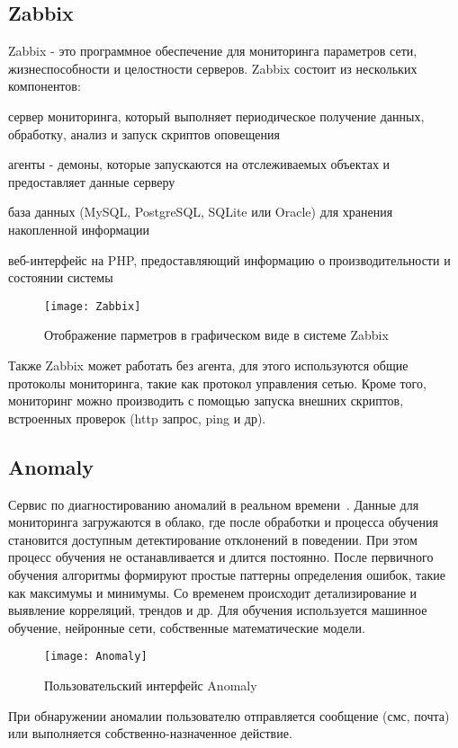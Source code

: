 \subsection{Zabbix}
Zabbix - это программное обеспечение для мониторинга параметров сети, жизнеспособности и целостности серверов. Zabbix состоит из нескольких компонентов:
\begin{itemize*}
	\item{сервер мониторинга, который выполняет периодическое получение данных, обработку, анализ и запуск скриптов оповещения}
	\item{агенты - демоны, которые запускаются на отслеживаемых объектах и предоставляет данные серверу}
	\item{база данных (MySQL, PostgreSQL, SQLite или Oracle) для хранения накопленной информации}
	\item{веб-интерфейс на PHP, предоставляющий информацию о производительности и состоянии системы}
\end{itemize*}

\begin{figure}[H]
	\centering
	\texttt{[image: Zabbix]}
	\caption{Отображение парметров в графическом виде в системе Zabbix}
	\label{fig:Zabbix}
\end{figure}

Также Zabbix может работать без агента, для этого используются общие протоколы мониторинга, такие как протокол управления сетью.  Кроме того, мониторинг можно производить с помощью запуска внешних скриптов, встроенных проверок (http запрос, ping и др). 

\subsection{Anomaly} 
Сервис по диагностированию аномалий в реальном времени~\cite{Anomaly}. Данные для мониторинга загружаются в облако, где после обработки и процесса обучения становится доступным детектирование отклонений в поведении. При этом процесс обучения не останавливается и длится постоянно. После первичного обучения алгоритмы формируют простые паттерны определения ошибок, такие как максимумы и минимумы. Со временем происходит детализирование и выявление корреляций, трендов и др. Для обучения используется машинное обучение, нейронные сети, собственные математические модели. 
\begin{figure}[h]
	\centering
	\texttt{[image: Anomaly]}
	\caption{Пользовательский интерфейс Anomaly}
	\label{fig:Anomaly}
\end{figure}
При обнаружении аномалии пользователю отправляется сообщение (смс, почта) или выполняется собственно-назначенное действие.

